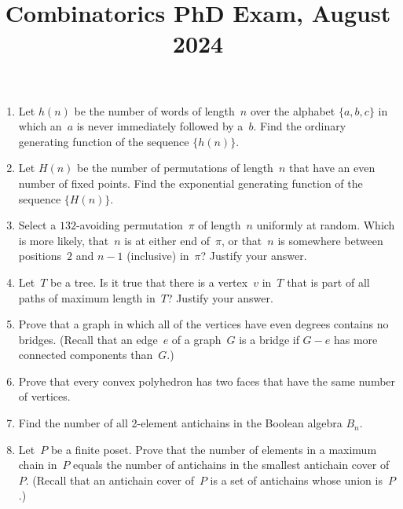 \documentclass[11pt,letterpaper]{article}
\title{Combinatorics PhD Exam, August 2024}
\author{}
\date{}
\newenvironment{examproblems}[2]{%
  \def\ProblemHeadingTag{#2}%
  \AssignTaggingSocketPlug{block/list/label}{examproblem}%
  \begin{enumerate}%
  \setcounter{enumi}{#1}%
  \renewcommand{\labelenumi}{\textbf{\theenumi.}}%
  \setlength{\topsep}{0.35em}%
  \setlength{\partopsep}{0pt}%
  \setlength{\itemsep}{0.48em}%
  \setlength{\parsep}{0.18em}%
}{\end{enumerate}}
\begin{document}
\maketitle
\thispagestyle{empty}
\begin{examproblems}{0}{H2}
\def\ProblemHeadingText{Problem 1.}
\item
Let \(h(n)\) be the number of words of length~\(n\) over the alphabet \(\{a,b,c\}\) in which an~\(a\) is never immediately followed by a~\(b\). Find the ordinary generating function of the sequence \(\{h(n)\}\).
\def\ProblemHeadingText{Problem 2.}
\item
Let \(H(n)\) be the number of permutations of length~\(n\) that have an even number of fixed points. Find the exponential generating function of the sequence \(\{H(n)\}\).
\def\ProblemHeadingText{Problem 3.}
\item
Select a \(132\)-avoiding permutation~\(\pi\) of length~\(n\) uniformly at random. Which is more likely, that~\(n\) is at either end of~\(\pi\), or that~\(n\) is somewhere between positions~\(2\) and \(n-1\) (inclusive) in~\(\pi\)? Justify your answer.
\def\ProblemHeadingText{Problem 4.}
\item
Let~\(T\) be a tree. Is it true that there is a vertex~\(v\) in~\(T\) that is part of all paths of maximum length in~\(T\)? Justify your answer.
\def\ProblemHeadingText{Problem 5.}
\item
Prove that a graph in which all of the vertices have even degrees contains no bridges. (Recall that an edge~\(e\) of a graph~\(G\) is a bridge if \(G-e\) has more connected components than~\(G\).)
\def\ProblemHeadingText{Problem 6.}
\item
Prove that every convex polyhedron has two faces that have the same number of vertices.
\def\ProblemHeadingText{Problem 7.}
\item
Find the number of all 2-element antichains in the Boolean algebra \(B_n\).
\def\ProblemHeadingText{Problem 8.}
\item
Let~\(P\) be a finite poset. Prove that the number of elements in a maximum chain in~\(P\) equals the number of antichains in the smallest antichain cover of~\(P\). (Recall that an antichain cover of~\(P\) is a set of antichains whose union is~\(P\).)
\end{examproblems}
\end{document}
